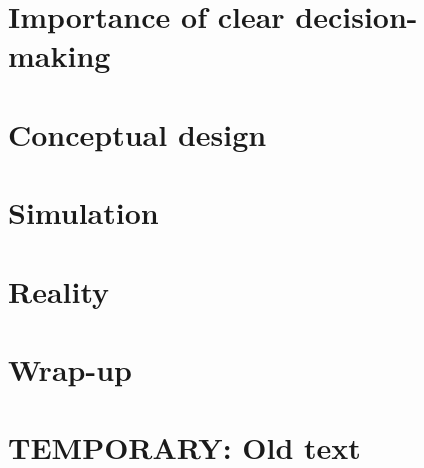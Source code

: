 \documentclass[a4paper,11pt,oneside]{book}
\begin{document}
\frontmatter


\makeCover %

\listoftodos[Notes]
\clearpage





\clearpage
\setcounter{tocdepth}{1}
\tableofcontents
\clearpage

\mainmatter



\part{Importance of clear decision-making}



\part{Conceptual design}
%




\part{Simulation}



\part{Reality}




\part{Wrap-up}



\backmatter

\part{TEMPORARY: Old text}






\end{document}
